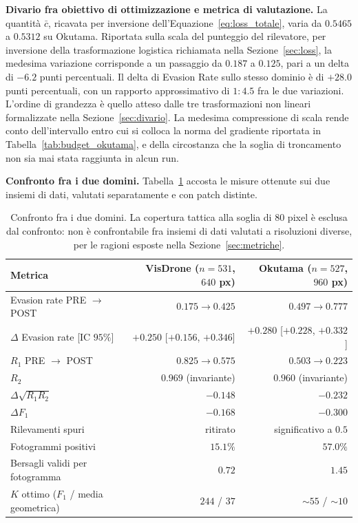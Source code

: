 \documentclass[a4paper,12pt]{report}
\begin{document}
\textbf{Divario fra obiettivo di ottimizzazione e metrica di valutazione.}
\label{sec:risultato_divario}
La quantità $\bar{c}$, ricavata per inversione dell'Equazione~\ref{eq:loss_totale}, varia da $0.5465$ a $0.5312$ su Okutama. Riportata sulla scala del punteggio del rilevatore, per inversione della trasformazione logistica richiamata nella Sezione~\ref{sec:loss}, la medesima variazione corrisponde a un passaggio da $0.187$ a $0.125$, pari a un delta di $-6.2$ punti percentuali. Il delta di Evasion Rate sullo stesso dominio è di $+28.0$ punti percentuali, con un rapporto approssimativo di $1{:}4.5$ fra le due variazioni. L'ordine di grandezza è quello atteso dalle tre trasformazioni non lineari formalizzate nella Sezione~\ref{sec:divario}. La medesima compressione di scala rende conto dell'intervallo entro cui si colloca la norma del gradiente riportata in Tabella~\ref{tab:budget_okutama}, e della circostanza che la soglia di troncamento non sia mai stata raggiunta in alcun run.

\textbf{Confronto fra i due domini.}
\label{sec:confronto_complessivo}
Tabella~\ref{tab:confronto_complessivo} accosta le misure ottenute sui due insiemi di dati, valutati separatamente e con patch distinte.

\begin{table}[t]
\centering
\small
\begin{tabular}{lrr}
\toprule
Metrica & VisDrone ($n = 531$, $640$ px) & Okutama ($n = 527$, $960$ px) \\
\midrule
Evasion rate PRE $\to$ POST & $0.175 \to 0.425$ & $0.497 \to 0.777$ \\
$\Delta$ Evasion rate [IC $95\%$] & $+0.250$ [$+0.156$, $+0.346$] & $+0.280$ [$+0.228$, $+0.332$] \\
$R_1$ PRE $\to$ POST & $0.825 \to 0.575$ & $0.503 \to 0.223$ \\
$R_2$ & $0.969$ (invariante) & $0.960$ (invariante) \\
$\Delta \sqrt{R_1 R_2}$ & $-0.148$ & $-0.232$ \\
$\Delta F_1$ & $-0.168$ & $-0.300$ \\
Rilevamenti spuri & ritirato & significativo a $0.5$ \\
Fotogrammi positivi & $15.1\%$ & $57.0\%$ \\
Bersagli validi per fotogramma & $0.72$ & $1.45$ \\
$K$ ottimo ($F_1$ / media geometrica) & $244$ / $37$ & $\sim 55$ / $\sim 10$ \\
\bottomrule
\end{tabular}
\caption{Confronto fra i due domini. La copertura tattica alla soglia di $80$ pixel è esclusa dal confronto: non è confrontabile fra insiemi di dati valutati a risoluzioni diverse, per le ragioni esposte nella Sezione~\ref{sec:metriche}.}
\label{tab:confronto_complessivo}
\end{table}
\end{document}
